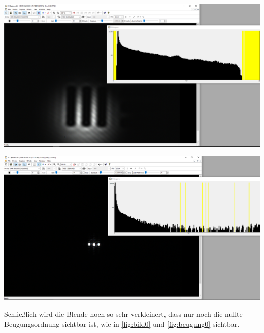 \documentclass[11pt,ngerman]{scrartcl}
\begin{document}
\begin{minipage}{\textwidth}
	\begin{minipage}[t]{0.5\textwidth}
		\centering
		\includegraphics[width=\textwidth]{abbe/objekt1ordnung}
		\label{fig:bild1}
	\end{minipage}
	\vspace{2mm}
	\begin{minipage}[t]{0.50\textwidth}
		\centering
		\includegraphics[width=\textwidth]{abbe/beugungsbild1ordnungen}
		\label{fig:beugung1}
	\end{minipage}
	\vspace{1em}
\end{minipage}

\noindent Schließlich wird die Blende noch so sehr verkleinert, dass nur noch die nullte Beugungsordnung sichtbar ist, wie in \autoref{fig:bild0} und \autoref{fig:beugung0} sichtbar.
\end{document}
